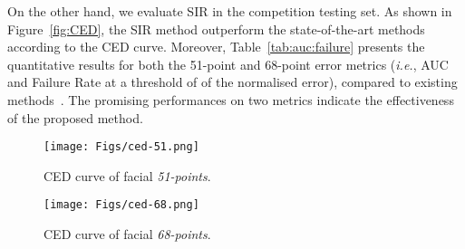 \documentclass[letterpaper]{article} \usepackage{aaai18}  \usepackage{times}  \usepackage{helvet}  \usepackage{courier}  \usepackage{url}  \usepackage{graphicx}
\def\ie{{\em i.e.}}
\begin{document}
On the other hand, we evaluate SIR in the  competition testing set. As shown in Figure~\ref{fig:CED}, the SIR method outperform the state-of-the-art methods~\cite{Cech:2016:MFL,Deng:2016,Fan:2016:AHL,Baltrusaitis:2013,Yan:2013,Zhou:Face++:2013,ivc:UricarFTSH16,Jaiswal_2013_ICCV_Workshops,Milborrow_2013_ICCV_Workshops,Hasan_2013_ICCV_Workshops,Martinez:2016:LRP} according to the CED curve. Moreover, Table~\ref{tab:auc:failure} presents the quantitative results for both the 51-point and 68-point error metrics (\ie, AUC and Failure Rate at a threshold of  of the normalised error), compared to existing methods~\cite{KazemiS:ERT:CVPR2014,Tzimiropoulos:PO-CR:CVP2015,AsthanaZCP:Chehra:CVPR2014,Xiong:SDM:CVPR2013,Zhou:Face++:2013,Yan:2013,ivc:UricarFTSH16,Zhu:CFSS:CVPR2015,Trigeorgis:MDM:CVPR16}. The promising performances on two metrics indicate the effectiveness of the proposed method.


\begin{figure*}[ht]
  \begin{subfigure}[b]{0.35\textwidth}
    \texttt{[image: Figs/ced-51.png]}
    \caption{CED curve of facial \emph{51-points}.}
    \label{fig:f1}
  \end{subfigure}
  \qquad \qquad \qquad \qquad
  \begin{subfigure}[b]{0.35\textwidth}
    \texttt{[image: Figs/ced-68.png]}
    \caption{CED curve of facial \emph{68-points}.}
    \label{fig:f2}
  \end{subfigure}
  \caption{CED curve results comparison in 300-W competition testing set.}
\label{fig:CED}
\end{figure*}
\end{document}
